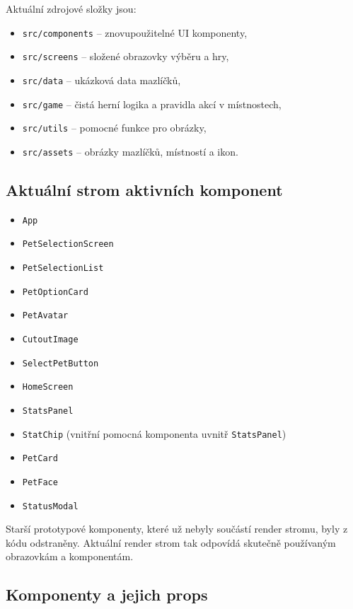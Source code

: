 \documentclass[12pt,a4paper]{article}
\begin{document}
Aktuální zdrojové složky jsou:
\begin{itemize}[leftmargin=2em]
  \item \texttt{src/components} -- znovupoužitelné UI komponenty,
  \item \texttt{src/screens} -- složené obrazovky výběru a hry,
  \item \texttt{src/data} -- ukázková data mazlíčků,
  \item \texttt{src/game} -- čistá herní logika a pravidla akcí v místnostech,
  \item \texttt{src/utils} -- pomocné funkce pro obrázky,
  \item \texttt{src/assets} -- obrázky mazlíčků, místností a ikon.
\end{itemize}

\subsection*{Aktuální strom aktivních komponent}

\begin{itemize}[leftmargin=2em]
  \item \texttt{App}
  \item \texttt{PetSelectionScreen}
  \item \texttt{PetSelectionList}
  \item \texttt{PetOptionCard}
  \item \texttt{PetAvatar}
  \item \texttt{CutoutImage}
  \item \texttt{SelectPetButton}
  \item \texttt{HomeScreen}
  \item \texttt{StatsPanel}
  \item \texttt{StatChip} (vnitřní pomocná komponenta uvnitř \texttt{StatsPanel})
  \item \texttt{PetCard}
  \item \texttt{PetFace}
  \item \texttt{StatusModal}
\end{itemize}

Starší prototypové komponenty, které už nebyly součástí render stromu, byly z kódu odstraněny. Aktuální render strom tak odpovídá skutečně používaným obrazovkám a komponentám.

\subsection*{Komponenty a jejich props}
\end{document}
